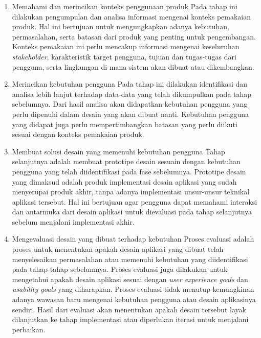 \begin{enumerate}
  \item Memahami dan merincikan konteks penggunaan produk
  \subitem Pada tahap ini dilakukan pengumpulan dan analisa informasi mengenai konteks pemakaian produk. Hal ini bertujuan untuk mengungkapkan adanya kebutuhan, permasalahan, serta batasan dari produk yang penting untuk pengembangan. Konteks pemakaian ini perlu mencakup informasi mengenai keseluruhan \textit{stakeholder}, karakteristik target pengguna, tujuan dan tugas-tugas dari pengguna, serta lingkungan di mana sistem akan dibuat atau dikembangkan.
   
  \item Merincikan kebutuhan pengguna
  \subitem Pada tahap ini dilakukan identifikasi dan analisa lebih lanjut terhadap data-data yang telah dikumpulkan pada tahap sebelumnya. Dari hasil analisa akan didapatkan kebutuhan pengguna yang perlu dipenuhi dalam desain yang akan dibuat nanti. Kebutuhan pengguna yang didapat juga perlu mempertimbangkan batasan yang perlu diikuti sesuai dengan konteks pemakaian produk.
  
  \item Membuat solusi desain yang memenuhi kebutuhan pengguna
  \subitem Tahap selanjutnya adalah membuat prototipe desain sesuain dengan kebutuhan pengguna yang telah diidentifikasi pada fase sebelumnya. Prototipe desain yang dimaksud adalah produk implementasi desain aplikasi yang sudah menyerupai produk akhir, tanpa adanya implementasi unsur-unsur teknikal aplikasi tersebut. Hal ini bertujuan agar pengguna dapat memahami interaksi dan antarmuka dari desain aplikasi untuk dievaluasi pada tahap selanjutnya sebelum menjalani implementasi akhir.
  
  \item Mengevaluasi desain yang dibuat terhadap kebutuhan
  \subitem Proses evaluasi adalah proses untuk menentukan apakah desain aplikasi yang dibuat telah menyelesaikan permasalahan atau memenuhi kebutuhan yang diidentifikasi pada tahap-tahap sebelumnya. Proses evaluasi juga dilakukan untuk mengetahui apakah desain aplikasi sesuai dengan \textit{user experience goals} dan \textit{usability goals} yang diharapkan. Proses evaluasi tidak menutup kemungkinan adanya wawasan baru mengenai kebutuhan pengguna atau desain aplikasinya sendiri. Hasil dari evaluasi akan menentukan apakah desain tersebut layak dilanjutkan ke tahap implementasi atau diperlukan iterasi untuk menjalani perbaikan.

\end{enumerate}




